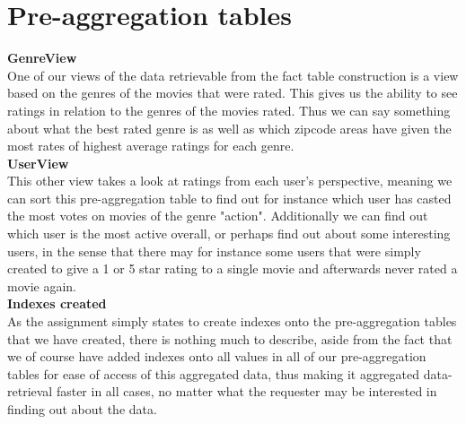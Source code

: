 \section*{Pre-aggregation tables}

\noindent\textbf{GenreView} \\
One of our views of the data retrievable from the fact table construction is a view based on the genres of the movies that were rated. This gives us the ability to see ratings in relation to the genres of the movies rated. Thus we can say something about what the best rated genre is as well as which zipcode areas have given the most rates of highest average ratings for each genre. \\

\noindent\textbf{UserView} \\
This other view takes a look at ratings from each user's perspective, meaning we can sort this pre-aggregation table to find out for instance which user has casted the most votes on movies of the genre "action". Additionally we can find out which user is the most active overall, or perhaps find out about some interesting users, in the sense that there may for instance some users that were simply created to give a 1 or 5 star rating to a single movie and afterwards never rated a movie again. \\

\noindent\textbf{Indexes created} \\
As the assignment simply states to create indexes onto the pre-aggregation tables that we have created, there is nothing much to describe, aside from the fact that we of course have added indexes onto all values in all of our pre-aggregation tables for ease of access of this aggregated data, thus making it aggregated data-retrieval faster in all cases, no matter what the requester may be interested in finding out about the data.